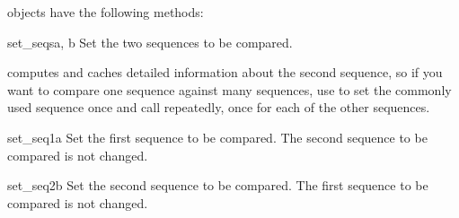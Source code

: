  objects have the following methods:

\begin{methoddesc}{set_seqs}{a, b}
  Set the two sequences to be compared.
\end{methoddesc}

 computes and caches detailed information about
the second sequence, so if you want to compare one sequence against
many sequences, use  to set the commonly used
sequence once and call  repeatedly, once for each
of the other sequences.

\begin{methoddesc}{set_seq1}{a}
  Set the first sequence to be compared.  The second sequence to be
  compared is not changed.
\end{methoddesc}

\begin{methoddesc}{set_seq2}{b}
  Set the second sequence to be compared.  The first sequence to be
  compared is not changed.
\end{methoddesc}

